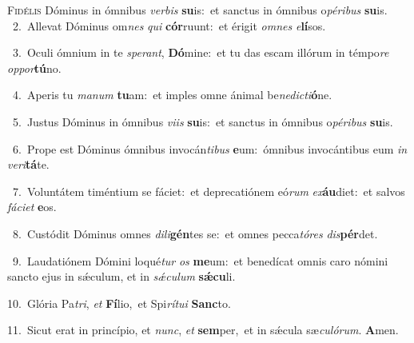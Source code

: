 \lettrine{\initial\textcolor{\initialcolor}{F}}{idélis} Dóminus in ómnibus \textit{ver}\-\textit{bis} \textbf{su}\-is:~\star et sanctus in ómnibus o\-\textit{pé}\-\textit{ri}\textit{bus} \textbf{su}\-is.\\
{\numbfont\textcolor{\numbcolor}{~2.}}~Allevat Dóminus om\textit{nes} \textit{qui} \textbf{cór}\-ruunt:~\star et érigit \textit{om}\-\textit{nes} \textit{e}\-\textbf{lí}sos.\par
{\numbfont\textcolor{\numbcolor}{~3.}}~Oculi ómnium in te \textit{spe}\-\textit{rant}, \textbf{Dó}\-mine:~\star et tu das escam illórum in témpo\textit{re} \textit{op}\-\textit{por}\textbf{tú}no.\par
{\numbfont\textcolor{\numbcolor}{~4.}}~Aperis tu \textit{ma}\-\textit{num} \textbf{tu}\-am:~\star et imples omne ánimal be\-\textit{ne}\-\textit{dic}\textit{ti}\textbf{ó}ne.\par
{\numbfont\textcolor{\numbcolor}{~5.}}~Justus Dóminus in ómnibus \textit{vi}\-\textit{is} \textbf{su}\-is:~\star et sanctus in ómnibus o\-\textit{pé}\-\textit{ri}\textit{bus} \textbf{su}\-is.\par
{\numbfont\textcolor{\numbcolor}{~6.}}~Prope est Dóminus ómnibus invocán\-\textit{ti}\-\textit{bus} \textbf{e}\-um:~\star ómnibus invocántibus eum \textit{in} \textit{ve}\-\textit{ri}\textbf{tá}te.\par
{\numbfont\textcolor{\numbcolor}{~7.}}~Voluntátem timéntium se fáciet:~\dagger et deprecatiónem eó\textit{rum} \textit{ex}\-\textbf{áu}diet:~\star et salvos \textit{fá}\-\textit{ci}\textit{et} \textbf{e}\-os.\par
{\numbfont\textcolor{\numbcolor}{~8.}}~Custódit Dóminus omnes \textit{di}\-\textit{li}\textbf{gén}tes se:~\star et omnes pecca\-\textit{tó}\-\textit{res} \textit{dis}\-\textbf{pér}det.\par
{\numbfont\textcolor{\numbcolor}{~9.}}~Laudatiónem Dómini loqué\textit{tur} \textit{os} \textbf{me}\-um:~\star et benedícat omnis caro nómini sancto ejus in sǽculum, et in \textit{sǽ}\-\textit{cu}\textit{lum} \textbf{sǽ}\-\textbf{cu}li.\par
{\numbfont\textcolor{\numbcolor}{10.}}~Glória Pa\-\textit{tri}\-, \textit{et} \textbf{Fí}\-lio,~\star et Spi\-\textit{rí}\-\textit{tu}\textit{i} \textbf{Sanc}\-to.\par
{\numbfont\textcolor{\numbcolor}{11.}}~Sicut erat in princípio, et \textit{nunc}\-, \textit{et} \textbf{sem}\-per,~\star et in sǽcula sæ\-\textit{cu}\-\textit{ló}\textit{rum}. \textbf{A}\-men.\par
